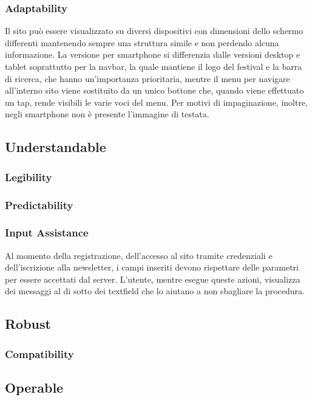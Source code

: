 \documentclass[10pt, a4paper]{article}
\begin{document}
\subsubsection{Adaptability}

Il sito può essere visualizzato su diversi dispositivi con dimensioni dello schermo differenti mantenendo sempre una struttura simile e non perdendo alcuna informazione. La versione per smartphone si differenzia dalle versioni desktop e tablet soprattutto per la navbar, la quale mantiene il logo del festival e la barra di ricerca, che hanno un'importanza prioritaria, mentre il menu per navigare all'interno sito viene sostituito da un unico bottone che, quando viene effettuato un tap, rende visibili le varie voci del menu. Per motivi di impaginazione, inoltre, negli smartphone non è presente l’immagine di testata.

\subsection{Understandable}

\subsubsection{Legibility}

\subsubsection{Predictability}

\subsubsection{Input Assistance}
Al momento della registrazione, dell’accesso al sito tramite credenziali e dell’iscrizione alla newsletter, i campi inseriti devono rispettare delle parametri per essere accettati dal server. L’utente, mentre esegue queste azioni, visualizza dei messaggi al di sotto dei textfield che lo aiutano a non sbagliare la procedura.

\subsection{Robust}

\subsubsection{Compatibility}

\subsection{Operable}
\end{document}
